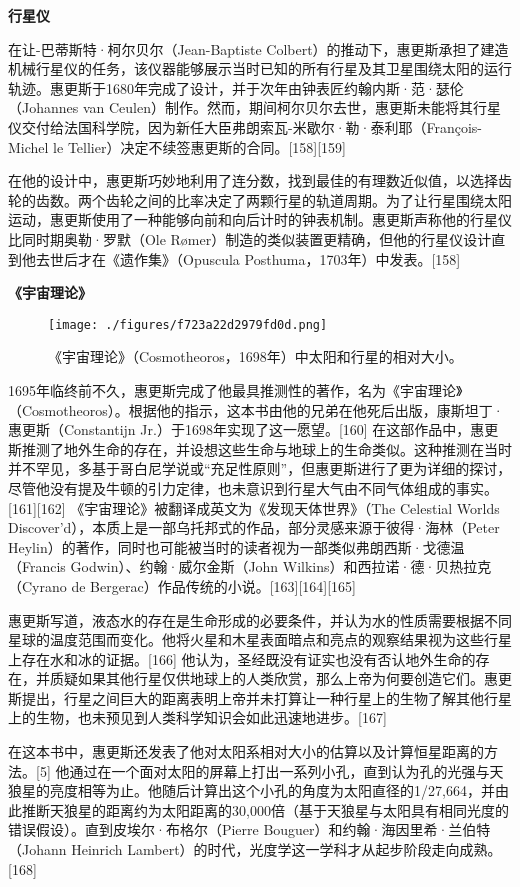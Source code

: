 \textbf{行星仪}

在让-巴蒂斯特·柯尔贝尔（Jean-Baptiste Colbert）的推动下，惠更斯承担了建造机械行星仪的任务，该仪器能够展示当时已知的所有行星及其卫星围绕太阳的运行轨迹。惠更斯于1680年完成了设计，并于次年由钟表匠约翰内斯·范·瑟伦（Johannes van Ceulen）制作。然而，期间柯尔贝尔去世，惠更斯未能将其行星仪交付给法国科学院，因为新任大臣弗朗索瓦-米歇尔·勒·泰利耶（François-Michel le Tellier）决定不续签惠更斯的合同。[158][159]

在他的设计中，惠更斯巧妙地利用了连分数，找到最佳的有理数近似值，以选择齿轮的齿数。两个齿轮之间的比率决定了两颗行星的轨道周期。为了让行星围绕太阳运动，惠更斯使用了一种能够向前和向后计时的钟表机制。惠更斯声称他的行星仪比同时期奥勒·罗默（Ole Rømer）制造的类似装置更精确，但他的行星仪设计直到他去世后才在《遗作集》（Opuscula Posthuma，1703年）中发表。[158]

\textbf{《宇宙理论》}
\begin{figure}[ht]
\centering
\texttt{[image: ./figures/f723a22d2979fd0d.png]}
\caption{《宇宙理论》（Cosmotheoros，1698年）中太阳和行星的相对大小。} \label{fig_HGS_16}
\end{figure}
1695年临终前不久，惠更斯完成了他最具推测性的著作，名为《宇宙理论》（Cosmotheoros）。根据他的指示，这本书由他的兄弟在他死后出版，康斯坦丁·惠更斯（Constantijn Jr.）于1698年实现了这一愿望。[160] 在这部作品中，惠更斯推测了地外生命的存在，并设想这些生命与地球上的生命类似。这种推测在当时并不罕见，多基于哥白尼学说或“充足性原则”，但惠更斯进行了更为详细的探讨，尽管他没有提及牛顿的引力定律，也未意识到行星大气由不同气体组成的事实。[161][162] 《宇宙理论》被翻译成英文为《发现天体世界》（The Celestial Worlds Discover’d），本质上是一部乌托邦式的作品，部分灵感来源于彼得·海林（Peter Heylin）的著作，同时也可能被当时的读者视为一部类似弗朗西斯·戈德温（Francis Godwin）、约翰·威尔金斯（John Wilkins）和西拉诺·德·贝热拉克（Cyrano de Bergerac）作品传统的小说。[163][164][165]

惠更斯写道，液态水的存在是生命形成的必要条件，并认为水的性质需要根据不同星球的温度范围而变化。他将火星和木星表面暗点和亮点的观察结果视为这些行星上存在水和冰的证据。[166] 他认为，圣经既没有证实也没有否认地外生命的存在，并质疑如果其他行星仅供地球上的人类欣赏，那么上帝为何要创造它们。惠更斯提出，行星之间巨大的距离表明上帝并未打算让一种行星上的生物了解其他行星上的生物，也未预见到人类科学知识会如此迅速地进步。[167]

在这本书中，惠更斯还发表了他对太阳系相对大小的估算以及计算恒星距离的方法。[5] 他通过在一个面对太阳的屏幕上打出一系列小孔，直到认为孔的光强与天狼星的亮度相等为止。他随后计算出这个小孔的角度为太阳直径的1/27,664，并由此推断天狼星的距离约为太阳距离的30,000倍（基于天狼星与太阳具有相同光度的错误假设）。直到皮埃尔·布格尔（Pierre Bouguer）和约翰·海因里希·兰伯特（Johann Heinrich Lambert）的时代，光度学这一学科才从起步阶段走向成熟。[168]

